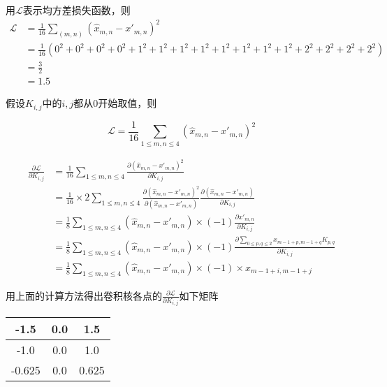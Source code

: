 \documentclass[12pt,AutoFakeBold]{article}
\begin{document}
    用\(\mathcal{L}\)表示均方差损失函数，则
    \begin{equation}
        \begin{split}
            \mathcal{L} &= \frac{1}{16}\sum_{(m,n)} (\hat{x}_{m,n} - {x'}_{m,n})^2\\
            &= \frac{1}{16}\left(0^2 + 0^2 + 0^2 + 0^2 + 1^2 + 1^2 +1^2 +1^2 +1^2 + 1^2 +1^2 +1^2 + 2^2 + 2^2 + 2^2 + 2^2 \right)\\
            &= \frac{3}{2}\\
            &= 1.5
        \end{split}
    \end{equation}

    假设\(K_{i,j}\)中的\(i,j\)都从0开始取值，则

    \begin{equation}
        \mathcal{L} = \frac{1}{16}\sum_{1 \leq m,n \leq 4} (\hat{x}_{m,n} - {x'}_{m,n})^2
    \end{equation}

    \begin{equation}
        \begin{split}
            \frac{\partial \mathcal{L}}{\partial K_{i,j}} 
            &= \frac{1}{16}\sum_{1\leq m,n \leq 4} \frac{\partial \left(\hat{x}_{m,n} - {x'}_{m,n}\right)^2}{\partial K_{i,j}}\\
            &= \frac{1}{16}\times 2\sum_{1\leq m,n \leq 4} \frac{\partial \left(\hat{x}_{m,n} - {x'}_{m,n}\right)^2}{\partial \left(\hat{x}_{m,n} - {x'}_{m,n}\right)}\frac{\partial \left(\hat{x}_{m,n} - {x'}_{m,n}\right)}{\partial K_{i,j}}\\
            &= \frac{1}{8}\sum_{1\leq m,n \leq 4} \left(\hat{x}_{m,n} - {x'}_{m,n}\right)\times (-1)\frac{\partial {x'}_{m,n}}{\partial K_{i,j}}\\
            &= \frac{1}{8}\sum_{1\leq m,n \leq 4} \left(\hat{x}_{m,n} - {x'}_{m,n}\right)\times (-1)\frac{\partial \sum_{0 \leq p,q\leq 2} x_{m-1+p,m-1+q}K_{p,q}}{\partial K_{i,j}}\\
            &= \frac{1}{8}\sum_{1\leq m,n \leq 4} \left(\hat{x}_{m,n} - {x'}_{m,n}\right)\times (-1)\times x_{m-1+i,m-1+j}
        \end{split}
    \end{equation}

    用上面的计算方法得出卷积核各点的\(\frac{\partial \mathcal{L}}{\partial K_{i,j}}\)如下矩阵

    \begin{center}
        \begin{tabular}{|c|c|c|}
            \hline
            -1.5&0.0&1.5\\
            \hline
            -1.0&0.0&1.0\\
            \hline
            -0.625&0.0&0.625\\
            \hline
        \end{tabular}
    \end{center}
\end{document}
